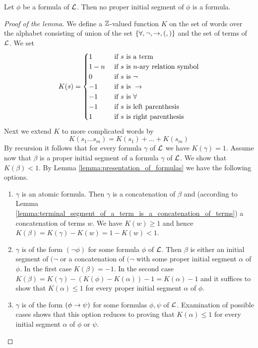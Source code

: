 \begin{lemma}\label{lemma:no_formula_is_a_proper_initial_segment_of_any_other_formula}
Let $\phi$ be a formula of ${\mathcal L}$. Then no proper initial segment of $\phi$ is a formula.
\end{lemma}
\begin{proof}[Proof of the lemma]
We define a ${\mathbb Z}$-valued function $K$ on the set of words over the alphabet consisting of union of the set $\{\forall, \neg, \rightarrow, (,)\}$ and the set of terms of ${\mathcal L}$. We set
$$K(s) = \begin{cases}
1 & \mbox{ if }s\mbox{ is a term}\\
1-n & \mbox{ if }s\mbox{ is $n$-ary relation symbol}\\
0 & \mbox{ if }s\mbox{ is }\neg\\
-1 & \mbox{ if }s\mbox{ is }\rightarrow\\
-1 & \mbox{ if }s\mbox{ is }\forall\\
-1 & \mbox{ if }s\mbox{ is left parenthesis}\\
1 & \mbox{ if }s\mbox{ is right parenthesis}\\
\end{cases}$$
Next we extend $K$ to more complicated words by
$$K(s_1...s_m) = K(s_1) +...+ K(s_m)$$
By recursion it follows that for every formula $\gamma$ of ${\mathcal L}$ we have $K(\gamma) = 1$. Assume now that $\beta$ is a proper initial segment of a formula $\gamma$ of ${\mathcal L}$. We show that $K(\beta) < 1$. By Lemma \ref{lemma:presentation_of_formulas} we have the following options.
\begin{enumerate}[label=\textbf{(\arabic*)}, leftmargin=3.0em]
\item $\gamma$ is an atomic formula. Then $\gamma$ is a concatenation of $\beta$ and (according to Lemma \ref{lemma:terminal_segment_of_a_term_is_a_concatenation_of_terms}) a concatenation of terms $w$. We have $K(w) \geq 1$ and hence $K(\beta) = K(\gamma)- K(w) = 1 - K(w) < 1$.
\item $\gamma$ is of the form $(\neg \phi)$ for some formula $\phi$ of ${\mathcal L}$. Then $\beta$ is either an initial segment of $(\neg$ or a concatenation of $(\neg$ with some proper initial segment $\alpha$ of $\phi$. In the first case $K(\beta) = -1$. In the second case $K(\beta) = K(\gamma) - (K(\phi) - K(\alpha)) -1 = K(\alpha)-1$ and it suffices to show that $K(\alpha) \leq 1$ for every proper initial segment $\alpha$ of $\phi$.
\item $\gamma$ is of the form $(\phi \rightarrow \psi)$ for some formulas $\phi, \psi$ of ${\mathcal L}$. Examination of possible cases shows that this option reduces to proving that $K(\alpha) \leq 1$ for every initial segment $\alpha$ of $\phi$ or $\psi$.

\end{enumerate}
\end{proof}
